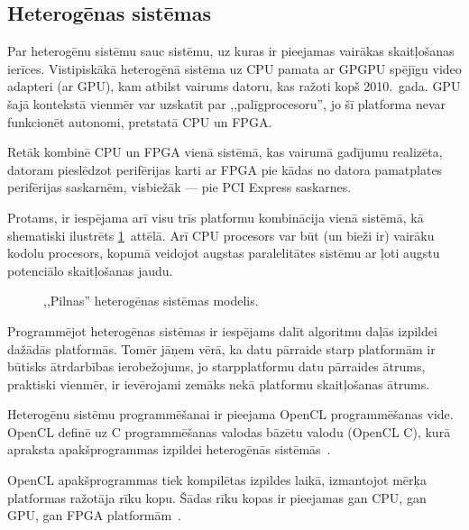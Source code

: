 \subsection{Heterogēnas sistēmas} \label{sec:heterogenous}
Par heterogēnu sistēmu sauc sistēmu, uz kuras ir pieejamas vairākas
skaitļošanas ierīces. Vistipiskākā heterogēnā sistēma uz CPU pamata ar
GPGPU spējīgu video adapteri (ar GPU), kam atbilst vairums datoru, kas
ražoti kopš 2010.~gada.
GPU šajā kontekstā vienmēr var uzskatīt par ,,palīgprocesoru'',
jo šī platforma nevar funkcionēt autonomi, pretstatā CPU un FPGA.

Retāk kombinē CPU un FPGA vienā sistēmā, kas vairumā gadījumu realizēta,
datoram pieslēdzot perifērijas karti ar FPGA pie kādas no datora
pamatplates perifērijas saskarnēm, visbiežāk --- pie PCI Express
saskarnes.

Protams, ir iespējama arī visu trīs platformu kombinācija vienā sistēmā, kā
shematiski ilustrēts \ref{fig:hetero-sys}~attēlā. Arī CPU procesors var
būt (un bieži ir) vairāku kodolu procesors, kopumā veidojot augstas paralelitātes
sistēmu ar ļoti augstu potenciālo skaitļošanas jaudu.

\begin{figure}[tbh]
	\centering
	\def\svgscale{1.3}
	{\small}
	\caption{,,Pilnas'' heterogēnas sistēmas modelis.}
	\label{fig:hetero-sys}
\end{figure}

Programmējot heterogēnas sistēmas ir iespējams dalīt algoritmu daļās
izpildei dažādās platformās. Tomēr jāņem vērā, ka datu pārraide starp
platformām ir būtisks ātrdarbības ierobežojums, jo starpplatformu 
datu pārraides ātrums, praktiski vienmēr, ir ievērojami zemāks nekā
platformu skaitļošanas ātrums.

Heterogēnu sistēmu programmēšanai ir pieejama OpenCL programmēšanas vide.
OpenCL definē uz C programmēšanas valodas bāzētu valodu (OpenCL C), kurā
apraksta apakšprogrammas izpildei heterogēnās sistēmās~\cite{OpenCL-book}. 

OpenCL apakšprogrammas tiek kompilētas izpildes laikā, izmantojot mērķa
platformas ražotāja rīku kopu. Šādas rīku kopas ir pieejamas gan CPU, gan GPU,
gan FPGA platformām~\cite{OpenCL-book}.

